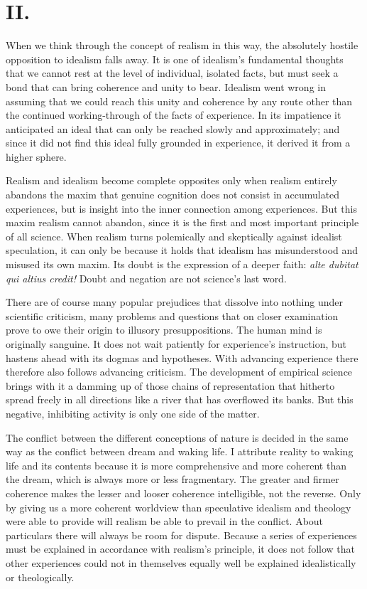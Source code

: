 \documentclass[12pt,a4paper]{article}
\newcommand{\opage}[1]{\marginnote{\footnotesize\textit{[#1]}}}
\begin{document}
\section*{II.}

When we think through the concept of realism in this way, the absolutely
hostile opposition to idealism falls away. It is one of idealism's
fundamental thoughts that we cannot rest at the level of individual,
isolated facts, but must seek a bond that can bring coherence and unity
to bear. Idealism went wrong in assuming that we could reach this unity
and coherence by any route other than the continued working-through of
the facts of experience. In its impatience it anticipated an ideal that
can \opage{5}only be reached slowly and approximately; and since it did not find
this ideal fully grounded in experience, it derived it from a higher
sphere.

Realism and idealism become complete opposites only when realism
entirely abandons the maxim that genuine cognition does not consist in
accumulated experiences, but is insight into the inner connection among
experiences. But this maxim realism cannot abandon, since it is the first
and most important principle of all science. When realism turns
polemically and skeptically against idealist speculation, it can only be
because it holds that idealism has misunderstood and misused its own
maxim. Its doubt is the expression of a deeper faith: \textit{alte dubitat
qui altius credit!} Doubt and negation are not science's last word.

There are of course many popular prejudices that dissolve into nothing
under scientific criticism, many problems and questions that on closer
examination prove to owe their origin to illusory presuppositions. The
human mind is originally sanguine. It does not wait patiently for
experience's instruction, but hastens ahead with its dogmas and
hypotheses. With advancing experience there therefore also follows
advancing criticism. The development of empirical science brings with it
a damming up of those chains of representation that hitherto spread
freely in all directions like a river that has overflowed its banks. But
this negative, inhibiting activity is only one side of the matter.

The conflict between the different conceptions of nature is decided in
the same way as the conflict between dream and waking life. I attribute
reality to waking life and its contents because it is more comprehensive
and more coherent than the dream, which is always more or less
fragmentary. The greater and firmer coherence makes the lesser and looser
coherence intelligible, not the reverse. Only by giving us a more coherent
worldview than speculative idealism and theology were able to provide will
realism be able to prevail in the conflict. About particulars there will
always be room for dispute. Because a series of experiences must be
explained in accordance with realism's principle, it does not follow that
other \opage{6}experiences could not in themselves equally well be explained
idealistically or theologically.
\end{document}
